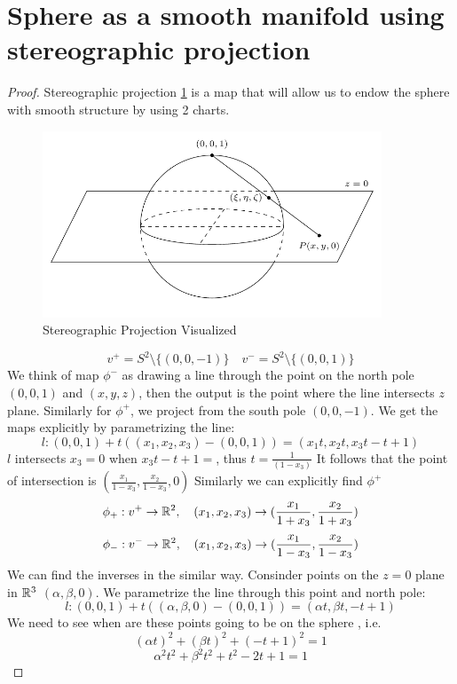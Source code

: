 \documentclass[11pt,a4paper]{report}
\begin{document}
\section{Sphere as a smooth manifold using stereographic projection}
\begin{proof}
Stereographic projection \ref{ster_proj} is a map that will allow us to endow the sphere with smooth structure by using 2 charts.
\newline
\begin{figure}[h] \label{ster_proj}
    \centering
    \includegraphics[width=0.90\textwidth]{stereographic_projection.png}
    \caption{Stereographic Projection Visualized}
\end{figure}
$$ v^{+} = S^2 \setminus \{(0,0,-1)\} \quad v^{-} = S^2 \setminus \{ (0,0,1) \} $$
We think of map $\phi^{-}$ as drawing a line through the point on the north pole $(0,0,1)$ and $(x,y,z)$, then the output is the point where the line intersects $z$ plane.
Similarly for $\phi^{+}$, we project from the south pole $(0,0,-1)$. We get the maps explicitly by parametrizing the line:
$$ l: (0,0,1) + t ((x_1,x_2,x_3) - (0,0,1)) =  (x_1 t,x_2 t, x_3 t-t+1) $$
$l$ intersects $x_3=0$ when $x_3t-t+1=$, thus $t = \frac{1}{(1-x_3)}$ It follows that the point of intersection is $(\frac{x_1}{1-x_3},\frac{x_2}{1-x_3},0)$
Similarly we can explicitly find $\phi^{+}$
$$ \phi_{+}: v^{+} \to \mathbb{R}^2, \quad (x_1,x_2,x_3) \to (\frac{x_1}{1+x_3}, \frac{x_2}{1+x_3} )$$
$$ \phi_{-}: v^{-} \to \mathbb{R}^2, \quad (x_1,x_2,x_3) \to (\frac{x_1}{1-x_3}, \frac{x_2}{1-x_3} )$$
We can find the inverses in the similar way.
Consinder points on the $z=0$ plane in $\mathbb{R}^3$ $(\alpha, \beta, 0)$. We parametrize the line through this point and north pole:
$$ l: (0,0,1) + t((\alpha, \beta, 0 ) - (0,0,1)) = (\alpha t, \beta t, -t +1)$$
We need to see when are these points going to be on the sphere , i.e.
$$ (\alpha t)^2  + (\beta t)^2 + (-t +1)^2 = 1 $$
$$ \alpha^2 t^2 + \beta^2 t^2 + t^2 - 2t + 1 = 1 $$

\end{proof}
\end{document}
